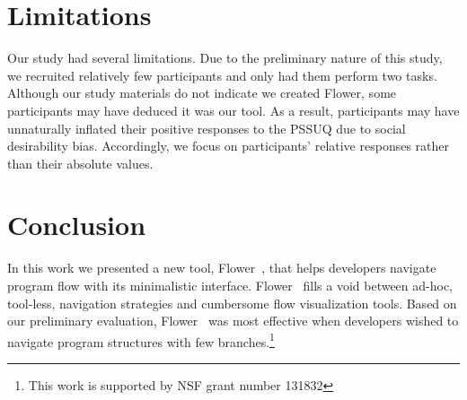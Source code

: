 \documentclass[conference]{IEEEtran}
\newcommand{\toolName}{Flower}
\begin{document}
	




\section{Limitations}
Our study had several limitations.
Due to the preliminary nature of this study, we recruited relatively few participants and only had them perform two tasks.
Although our study materials do not indicate we created \toolName, some participants may have deduced it was our tool.
As a result, participants may have unnaturally inflated their positive responses to the PSSUQ due to social desirability bias.
Accordingly, we focus on participants' relative responses rather than their absolute values.

\section{Conclusion}

In this work we presented a new tool, \toolName~, that helps developers navigate program flow with its minimalistic interface. 
\toolName~ fills a void between ad-hoc, tool-less, navigation strategies and cumbersome flow visualization tools.
Based on our preliminary evaluation, \toolName~ was most effective when developers wished to navigate program structures with few branches.\footnote{This work is supported by NSF grant number 131832}












\end{document}
